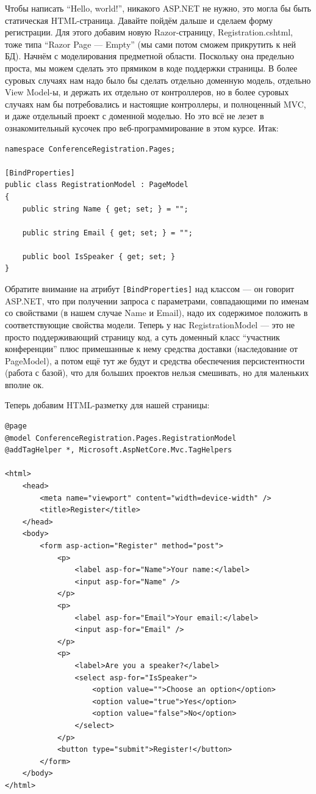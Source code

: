\documentclass{../../text-style}
\begin{document}
Чтобы написать \enquote{Hello, world!}, никакого ASP.NET не нужно, это могла бы быть статическая HTML-страница. Давайте пойдём дальше и сделаем форму регистрации. Для этого добавим новую Razor-страницу, Registration.cshtml, тоже типа \enquote{Razor Page --- Empty} (мы сами потом сможем прикрутить к ней БД). Начнём с моделирования предметной области. Поскольку она предельно проста, мы можем сделать это прямиком в коде поддержки страницы. В более суровых случаях нам надо было бы сделать отдельно доменную модель, отдельно View Model-ы, и держать их отдельно от контроллеров, но в более суровых случаях нам бы потребовались и настоящие контроллеры, и полноценный MVC, и даже отдельный проект с доменной моделью. Но это всё не лезет в ознакомительный кусочек про веб-программирование в этом курсе. Итак:

\begin{verbatim}
namespace ConferenceRegistration.Pages;

[BindProperties]
public class RegistrationModel : PageModel
{
    public string Name { get; set; } = "";

    public string Email { get; set; } = "";

    public bool IsSpeaker { get; set; }
}
\end{verbatim}

Обратите внимание на атрибут \texttt{[BindProperties]} над классом --- он говорит ASP.NET, что при получении запроса с параметрами, совпадающими по именам со свойствами (в нашем случае Name и Email), надо их содержимое положить в соответствующие свойства модели. Теперь у нас RegistrationModel --- это не просто поддерживающий страницу код, а суть доменный класс \enquote{участник конференции} плюс примешанные к нему средства доставки (наследование от PageModel), а потом ещё тут же будут и средства обеспечения персистентности (работа с базой), что для больших проектов нельзя смешивать, но для маленьких вполне ок.

Теперь добавим HTML-разметку для нашей страницы:

\begin{verbatim}
@page
@model ConferenceRegistration.Pages.RegistrationModel
@addTagHelper *, Microsoft.AspNetCore.Mvc.TagHelpers

<html>
    <head>
        <meta name="viewport" content="width=device-width" />
        <title>Register</title>
    </head>
    <body>
        <form asp-action="Register" method="post">
            <p>
                <label asp-for="Name">Your name:</label>
                <input asp-for="Name" />
            </p>
            <p>
                <label asp-for="Email">Your email:</label>
                <input asp-for="Email" />
            </p>
            <p>
                <label>Are you a speaker?</label>
                <select asp-for="IsSpeaker">
                    <option value="">Choose an option</option>
                    <option value="true">Yes</option>
                    <option value="false">No</option>
                </select>
            </p>
            <button type="submit">Register!</button>
        </form>
    </body>
</html>
\end{verbatim}
\end{document}
